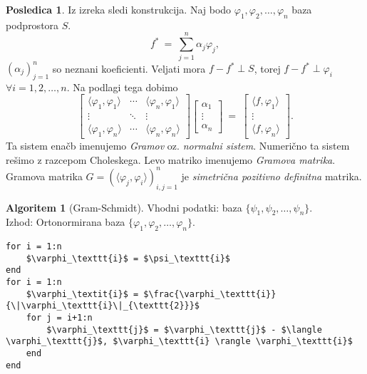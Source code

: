 \documentclass[11pt]{article}
\theoremstyle{definition}
\theoremstyle{definition}
\newtheorem*{algoritem}{Algoritem}
\newtheorem*{posledica}{Posledica}
\begin{document}
\begin{posledica}

Iz izreka sledi konstrukcija. Naj bodo $\varphi_1, \varphi_2, \ldots, \varphi_n$ baza podprostora $S$. 
$$f^* ~=~ \sum_{j=1}^n \alpha_j \varphi_j,$$ 
$(\alpha_j)_{j=1}^n$ so neznani koeficienti. Veljati mora $f - f^* \perp S$, torej $f - f^* \perp \varphi_i$ $\forall i = 1, 2, \ldots, n$. Na podlagi tega dobimo
$$\begin{bmatrix}
\langle \varphi_1, \varphi_1 \rangle & \cdots & \langle \varphi_n, \varphi_1 \rangle \\
\vdots & \ddots & \vdots \\
\langle \varphi_1, \varphi_n \rangle & \cdots & \langle \varphi_n, \varphi_n \rangle
\end{bmatrix} \begin{bmatrix}
\alpha_1 \\
\vdots \\
\alpha_n
\end{bmatrix} ~=~ \begin{bmatrix}
\langle f, \varphi_1 \rangle \\
\vdots \\
\langle f, \varphi_n \rangle
\end{bmatrix}.$$
Ta sistem enačb imenujemo \textit{Gramov} oz. \textit{normalni sistem}. Numerično ta sistem rešimo z razcepom Choleskega. Levo matriko imenujemo \textit{Gramova matrika}. Gramova matrika $G = (\langle \varphi_j, \varphi_i \rangle)_{i,j=1}^n$ je \textit{simetrična pozitivno definitna} matrika.

\end{posledica}
\vspace{0.5cm}

\pagebreak

\begin{algoritem}[Gram-Schmidt]

Vhodni podatki: baza $\{\psi_1, \psi_2, \ldots, \psi_n\}$. \\
Izhod: Ortonormirana baza $\{\varphi_1, \varphi_2, \ldots, \varphi_n\}$.
\begin{lstlisting}
for i = 1:n
	$\varphi_\texttt{i}$ = $\psi_\texttt{i}$
end
for i = 1:n
	$\varphi_\textit{i}$ = $\frac{\varphi_\texttt{i}}{\|\varphi_\texttt{i}\|_{\texttt{2}}}$
	for j = i+1:n
		$\varphi_\texttt{j}$ = $\varphi_\texttt{j}$ - $\langle \varphi_\texttt{j}$, $\varphi_\texttt{i} \rangle \varphi_\texttt{i}$
	end
end
\end{lstlisting}

\end{algoritem}
\vspace{0.5cm}
\end{document}
